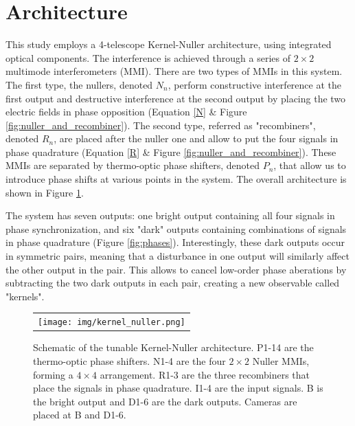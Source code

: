 \documentclass[]{spie}  %
\begin{document}
\section{Architecture}

This study employs a 4-telescope Kernel-Nuller architecture, using integrated optical components. The interference is achieved through a series of $2 \times 2$ multimode interferometers\cite{MMI} (MMI). There are two types of MMIs in this system. The first type, the nullers, denoted $N_n$, perform constructive interference at the first output and destructive interference at the second output by placing the two electric fields in phase opposition (Equation \ref{N} \& Figure \ref{fig:nuller_and_recombiner}). The second type, referred as "recombiners", denoted $R_n$, are placed after the nuller one and allow to put the four signals in phase quadrature (Equation \ref{R} \& Figure \ref{fig:nuller_and_recombiner}). These MMIs are separated by thermo-optic phase shifters, denoted $P_n$, that allow us to introduce phase shifts at various points in the system. The overall architecture is shown in Figure \ref{fig:kernel_nuller}.

The system has seven outputs: one bright output containing all four signals in phase synchronization, and six "dark" outputs containing combinations of signals in phase quadrature (Figure \ref{fig:phases}). Interestingly, these dark outputs occur in symmetric pairs, meaning that a disturbance in one output will similarly affect the other output in the pair. This allows to cancel low-order phase aberations by subtracting the two dark outputs in each pair, creating a new observable called "kernels"\cite{Martinache et al. 2018}.

\begin{figure} [H]
    \begin{center}
    \begin{tabular}{c}
    \texttt{[image: img/kernel\_nuller.png]}
    \end{tabular}
    \end{center}
    \caption[kernel_nuller] 
    { \label{fig:kernel_nuller} 
    Schematic of the tunable Kernel-Nuller architecture. P1-14 are the thermo-optic phase shifters. N1-4 are the four $2 \times 2$ Nuller MMIs, forming a $4 \times 4$ arrangement. R1-3 are the three recombiners that place the signals in phase quadrature. I1-4 are the input signals. B is the bright output and D1-6 are the dark outputs. Cameras are placed at B and D1-6.}
\end{figure} 
\end{document}
